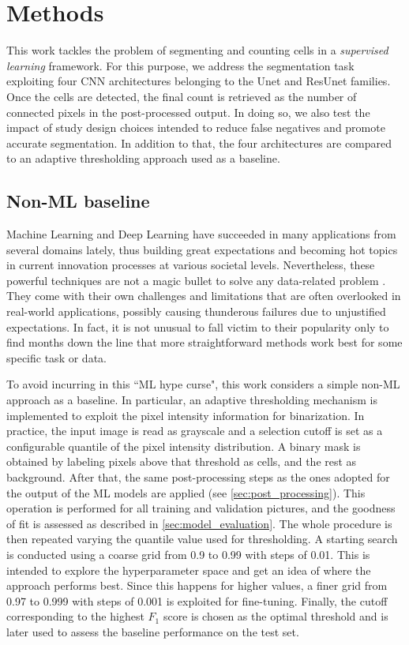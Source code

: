 \chapter{Methods}
\label{chap:partI_methods}

This work tackles the problem of segmenting and counting cells in a \textit{supervised learning} framework. For this purpose, we address the segmentation task exploiting four CNN architectures belonging to the Unet and ResUnet families. 
Once the cells are detected, the final count is retrieved as the number of connected pixels in the post-processed output.
In doing so, we also test the impact of study design choices intended to reduce false negatives and promote accurate segmentation.
In addition to that, the four architectures are compared to an adaptive thresholding approach used as a baseline. 

\section{Non-ML baseline}
\label{baseline}

Machine Learning and Deep Learning have succeeded in many applications from several domains lately, thus building great expectations and becoming hot topics in current innovation processes at various societal levels.
Nevertheless, these powerful techniques are not a magic bullet to solve any data-related problem \cite{wolpert1997nofreelunch}. They come with their own challenges and limitations that are often overlooked in real-world applications, possibly causing thunderous failures due to unjustified expectations.
In fact, it is not unusual to fall victim to their popularity only to find months down the line that more straightforward methods work best for some specific task or data.

To avoid incurring in this ``ML hype curse", this work considers a simple non-ML approach as a baseline. 
In particular, an adaptive thresholding mechanism is implemented to exploit the pixel intensity information for binarization.
In practice, the input image is read as grayscale and a selection cutoff is set as a configurable quantile of the pixel intensity distribution.
A binary mask is obtained by labeling pixels above that threshold as cells, and the rest as background.
After that, the same post-processing steps as the ones adopted for the output of the ML models are applied (see \cref{sec:post_processing}).
This operation is performed for all training and validation pictures, and the goodness of fit is assessed as described in \cref{sec:model_evaluation}.
The whole procedure is then repeated varying the quantile value used for thresholding. A starting search is conducted using a coarse grid from 0.9 to 0.99 with steps of 0.01. This is intended to explore the hyperparameter space and get an idea of where the approach performs best. 
Since this happens for higher values, a finer grid from 0.97 to 0.999 with steps of 0.001 is exploited for fine-tuning.
Finally, the cutoff corresponding to the highest $F_1$ score is chosen as the optimal threshold and is later used to assess the baseline performance on the test set.

